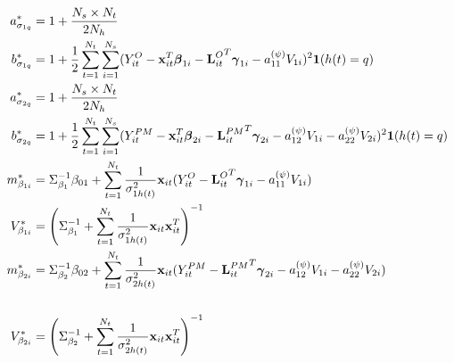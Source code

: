 \documentclass[alpha-refs]{wiley-article}
\newcommand{\bbeta}{ \mbox{\boldmath $ \beta $} }
\newcommand{\bgamma}{ \mbox{\boldmath $\gamma$} }
\newcommand{\bone}{\textbf{1}}
\newcommand{\bL}{\textbf{L}}
\newcommand{\bS}{\textbf{S}}
\newcommand{\bx}{\textbf{x}}
\begin{document}
{\footnotesize
\begin{align*}
a^*_{\sigma_{1 q}} &= 1 + \frac{N_s \times N_t}{2 N_h }\\
b^*_{\sigma_{1 q}} &= 1 + \frac{1}{2} \sum_{t=1}^{N_t} \sum_{i=1}^{N_s} (Y^{O}_{it} - \bx_{it}^T \bbeta_{1i}-{\bL^{O}_{it}}^T\bgamma_{1i} - a_{11}^{(\psi)} V_{1i}  )^2 \bone( h(t) = q) \\
a^*_{\sigma_{2 q}} &= 1 + \frac{N_s \times N_t}{2 N_h}\\
b^*_{\sigma_{2 q}} &= 1 + \frac{1}{2} \sum_{t=1}^{N_t} \sum_{i=1}^{N_s} (Y^{PM}_{it} - \bx_{it}^T \bbeta_{2i} -{\bL^{PM}_{it}}^T\bgamma_{2i} - a_{12}^{(\psi)} V_{1i}- a_{22}^{(\psi)} V_{2i}  )^2\bone( h(t) = q) \\
m_{\beta_{1i} }^* &= \Sigma_{\beta_1}^{-1} \beta_{01} + \sum^{N_t}_{t=1} \frac{1}{\sigma^2_{1h(t)} }  \bx_{it} (Y^{O}_{it}- {\bL^{O}_{it}}^T\bgamma_{1i} - a_{11}^{(\psi)} V_{1i} )   \\
V_{\beta_{1i} }^* &= \left( \Sigma_{\beta_1}^{-1} + \sum^{N_t}_{t=1}\frac{1}{\sigma^2_{1h(t)} }  \bx_{it} \bx_{it}^T  \right)^{-1} \\
m_{\beta_{2i} }^* &= \Sigma_{\beta_2}^{-1} \beta_{02} +\sum^{N_t}_{t=1} \frac{1}{\sigma^2_{2h(t)} } \bx_{it} (Y^{PM}_{it} - {\bL^{PM}_{it}}^T\bgamma_{2i} - a_{12}^{(\psi)} V_{1i}- a_{22}^{(\psi)} V_{2i}  )   \\ \\
V_{\beta_{2i} }^* &= \left( \Sigma_{\beta_2}^{-1} +\sum^{N_t}_{t=1}  \frac{1}{\sigma^2_{2h(t)} }\bx_{it} \bx_{it}^T  \right)^{-1} \\

\end{align*}}
\end{document}

